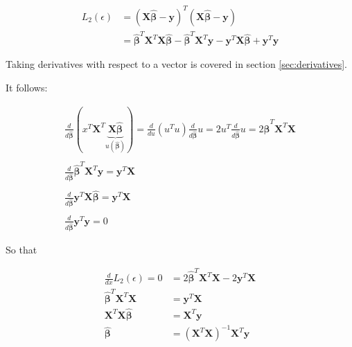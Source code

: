 \begin{equation}
\begin{array}{rl}
L_2(\epsilon) &= \left(\mathbf{X}\mathbf{\hat{\beta}}-\mathbf{y}\right)^T\left(\mathbf{X}\mathbf{\hat{\beta}}-\mathbf{y}\right)\\
&= \mathbf{\hat{\beta}}^T\mathbf{X}^T\mathbf{X}\mathbf{\hat{\beta}} - \mathbf{\hat{\beta}}^T\mathbf{X}^T\mathbf{y} - \mathbf{y}^T\mathbf{X}\mathbf{\hat{\beta}} + \mathbf{y}^T\mathbf{y}
\end{array}
\end{equation}

Taking derivatives with respect to a vector is covered in section \ref{sec:derivatives}.

It follows:

\begin{equation}
\begin{array}{l}
\frac{d}{d\mathbf{\hat{\beta}}}\left(x^T\mathbf{X}^T\underbrace{\mathbf{X}\mathbf{\hat{\beta}}}_{u(\mathbf{\hat{\beta}})}\right) = \frac{d}{du}\left(u^Tu\right)\frac{d}{d\mathbf{\hat{\beta}}}u = 2u^T\frac{d}{d\mathbf{\hat{\beta}}}u = 2\mathbf{\hat{\beta}}^T\mathbf{X}^T\mathbf{X}\\
\\
\frac{d}{d\mathbf{\hat{\beta}}}\mathbf{\hat{\beta}}^T\mathbf{X}^T\mathbf{y} = \mathbf{y}^T\mathbf{X}\\
\\
\frac{d}{d\mathbf{\hat{\beta}}}\mathbf{y}^T\mathbf{X}\mathbf{\hat{\beta}} = \mathbf{y}^T\mathbf{X}\\
\\
\frac{d}{d\mathbf{\hat{\beta}}}\mathbf{y}^T\mathbf{y} = 0
\end{array}
\end{equation}

So that	

\begin{equation}
\begin{array}{rl}
\frac{d}{dx}L_2(\epsilon) = 0 &= 2\mathbf{\hat{\beta}}^T\mathbf{X}^T\mathbf{X} - 2\mathbf{y}^T\mathbf{X}\\
\mathbf{\hat{\beta}}^T\mathbf{X}^T\mathbf{X} &= \mathbf{y}^T\mathbf{X}\\
\mathbf{X}^T\mathbf{X}\mathbf{\hat{\beta}} &= \mathbf{X}^T\mathbf{y}\\
\mathbf{\hat{\beta}} &= \left(\mathbf{X}^T\mathbf{X}\right)^{-1}\mathbf{X}^T\mathbf{y}
\end{array}
\end{equation}



